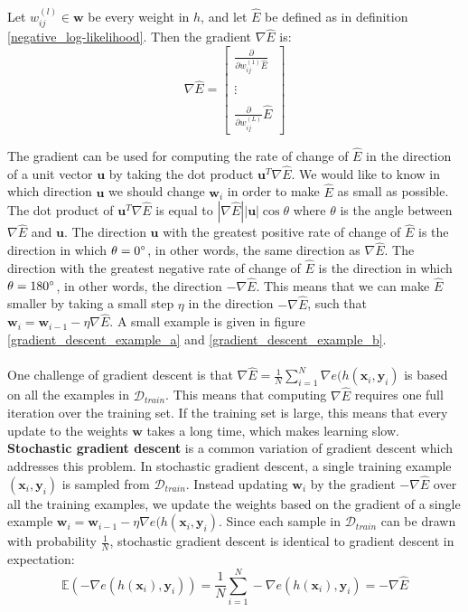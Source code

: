 \begin{definition}[gradient]
	\label{gradient}
	Let $w^{(l)}_{ij} \in \mathbf{w}$ be every weight in $h$, and let $\hat{E}$ be defined as in definition \ref{negative_log-likelihood}. Then the gradient $\nabla \hat{E}$ is:
	$$
	\nabla \hat{E} = \begin{bmatrix} \frac{\partial}{\partial w^{(1)}_{ij}\hat{E}} \\ \\ \vdots \\ \\ \frac{\partial}{\partial w^{(L)}_{ij}}\hat{E}\end{bmatrix}
	$$
\end{definition}
The gradient can be used for computing the rate of change of $\hat{E}$ in the direction of a unit vector $\mathbf{u}$ by taking the dot product $\mathbf{u}^T\nabla \hat{E}$. We would like to know in which direction $\mathbf{u}$ we should change $\mathbf{w}_i$ in order to make $\hat{E}$ as small as possible. The dot product of $\mathbf{u}^T\nabla \hat{E}$ is equal to $|\nabla \hat{E}||\mathbf{u}|\cos \theta$ where $\theta$ is the angle between $\nabla \hat{E}$ and $\mathbf{u}$. The direction $\mathbf{u}$ with the greatest positive rate of change of $\hat{E}$ is the direction in which $\theta = 0\degree$, in other words, the same direction as $\nabla \hat{E}$. The direction with the greatest negative rate of change of $\hat{E}$ is the direction in which $\theta = 180\degree$, in other words, the direction $-\nabla \hat{E}$. This means that we can make $\hat{E}$ smaller by taking a small step $\eta$ in the direction $-\nabla \hat{E}$, such that $\mathbf{w}_i = \mathbf{w}_{i-1} - \eta\nabla\hat{E}$. A small example is given in figure \ref{gradient_descent_example_a} and \ref{gradient_descent_example_b}.
\\\\
One challenge of gradient descent is that $\nabla \hat{E} = \frac{1}{N}\sum_{i=1}^N\nabla e(h(\mathbf{x}_i, \mathbf{y}_i)$ is based on all the examples in $\mathcal{D}_{train}$. This means that computing $\nabla \hat{E}$ requires one full iteration over the training set. If the training set is large, this means that every update to the weights $\mathbf{w}$ takes a long time, which makes learning slow. \textbf{Stochastic gradient descent} is a common variation of gradient descent which addresses this problem. In stochastic gradient descent, a single training example $(\mathbf{x}_i, \mathbf{y}_i)$ is sampled from $\mathcal{D}_{train}$. Instead updating $\mathbf{w}_i$ by the gradient $-\nabla \hat{E}$ over all the training examples, we update the weights based on the gradient of a single example $\mathbf{w}_i = \mathbf{w}_{i-1}-\eta\nabla e(h(\mathbf{x}_i, \mathbf{y}_i)$. Since each sample in $\mathcal{D}_{train}$ can be drawn with probability $\frac{1}{N}$, stochastic gradient descent is identical to gradient descent in expectation:
$$
\mathbb{E}(-\nabla e(h(\mathbf{x}_i), \mathbf{y}_i)) = \frac{1}{N}\sum\limits_{i=1}^N -\nabla e(h(\mathbf{x}_i), \mathbf{y}_i) = -\nabla\hat{E}
$$

